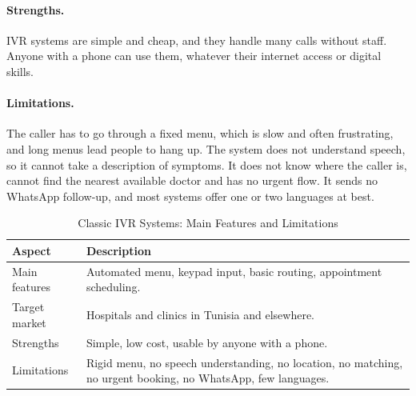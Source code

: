 \paragraph{Strengths.} IVR systems are simple and cheap, and they handle many calls without staff. Anyone with a phone can use them, whatever their internet access or digital skills.

\paragraph{Limitations.} The caller has to go through a fixed menu, which is slow and often frustrating, and long menus lead people to hang up. The system does not understand speech, so it cannot take a description of symptoms. It does not know where the caller is, cannot find the nearest available doctor and has no urgent flow. It sends no WhatsApp follow-up, and most systems offer one or two languages at best.

\begin{table}[H]
    \centering
    \caption{Classic IVR Systems: Main Features and Limitations}
    \label{tab:ivr}
    \small
    \begin{tabular}{>{\raggedright\arraybackslash}p{\dimexpr 0.3571\dimexpr\textwidth-4\tabcolsep\relax\relax}>{\raggedright\arraybackslash}p{\dimexpr 0.6429\dimexpr\textwidth-4\tabcolsep\relax\relax}}
        \toprule
        \textbf{Aspect} & \textbf{Description} \\
        \midrule
        Main features & Automated menu, keypad input, basic routing, appointment scheduling. \\
        Target market & Hospitals and clinics in Tunisia and elsewhere. \\
        Strengths & Simple, low cost, usable by anyone with a phone. \\
        Limitations & Rigid menu, no speech understanding, no location, no matching, no urgent booking, no WhatsApp, few languages. \\
        \bottomrule
    \end{tabular}
    \\[0.2cm]
\end{table}

